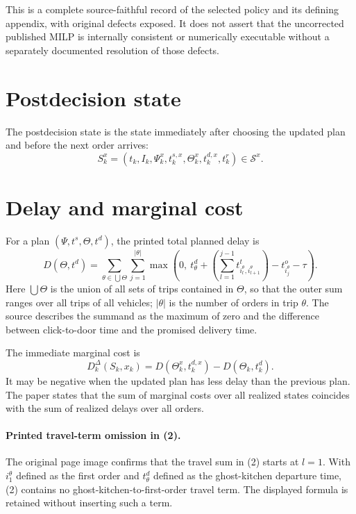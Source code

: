 \documentclass{article}
\begin{document}
This is a complete source-faithful record of the selected policy and its defining appendix, with original defects exposed. It does not assert that the uncorrected published MILP is internally consistent or numerically executable without a separately documented resolution of those defects.

\section*{Postdecision state}

The postdecision state is the state immediately after choosing the updated plan and before the next order arrives:
\[
S^x_k=(t_k,I_k,\Psi^x_k,t^{s,x}_k,\Theta^x_k,t^{d,x}_k,t^r_k)
\in\mathcal{S}^x.
\]

\section*{Delay and marginal cost}

For a plan \((\Psi,t^s,\Theta,t^d)\), the printed total planned delay is
\begin{equation}
D(\Theta,t^d)
=
\sum_{\theta\in\bigcup\Theta}
\sum_{j=1}^{|\theta|}
\max\left(
0,\ t^d_\theta+
\left(\sum_{l=1}^{j-1}t^t_{i^\theta_l,i^\theta_{l+1}}\right)
-t^o_{i^\theta_j}-\tau
\right).
\tag{2}
\end{equation}
Here \(\bigcup\Theta\) is the union of all sets of trips contained in \(\Theta\), so that the outer sum ranges over all trips of all vehicles; \(|\theta|\) is the number of orders in trip \(\theta\). The source describes the summand as the maximum of zero and the difference between click-to-door time and the promised delivery time.

The immediate marginal cost is
\begin{equation}
D^\Delta_k(S_k,x_k)
=D(\Theta^x_k,t^{d,x}_k)-D(\Theta_k,t^d_k).
\tag{3}
\end{equation}
It may be negative when the updated plan has less delay than the previous plan. The paper states that the sum of marginal costs over all realized states coincides with the sum of realized delays over all orders.

\paragraph{Printed travel-term omission in (2).}
The original page image confirms that the travel sum in (2) starts at \(l=1\). With \(i^\theta_1\) defined as the first order and \(t^d_\theta\) defined as the ghost-kitchen departure time, (2) contains no ghost-kitchen-to-first-order travel term. The displayed formula is retained without inserting such a term.
\end{document}
